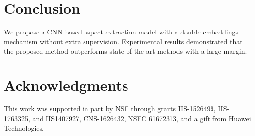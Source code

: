 \documentclass[11pt,a4paper]{article}
\begin{document}
\section{Conclusion}
We propose a CNN-based aspect extraction model with a double embeddings mechanism without extra supervision.
Experimental results demonstrated that the proposed method outperforms state-of-the-art methods with a large margin.

\section{ Acknowledgments}
This work was supported in part by NSF through grants IIS-1526499, IIS-1763325, and IIS1407927, CNS-1626432, NSFC 61672313, and a gift from Huawei Technologies.



\end{document}
